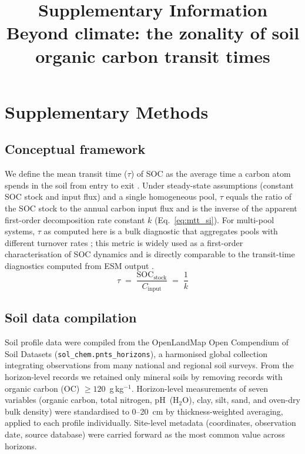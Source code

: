\documentclass[12pt, a4paper]{article}
\title{Supplementary Information\\[4pt]
\large Beyond climate: the zonality of soil organic carbon transit times}
\date{}
\begin{document}
\maketitle

\tableofcontents
\newpage

\section{Supplementary Methods}

\subsection{Conceptual framework}
We define the mean transit time ($\tau$) of SOC as the average time a carbon atom
spends in the soil from entry to exit \citep{Sierra2017,Sierra2018}. Under
steady-state assumptions (constant SOC stock and input flux) and a single homogeneous
pool, $\tau$ equals the ratio of the SOC stock to the annual carbon input flux and is
the inverse of the apparent first-order decomposition rate constant $k$
(Eq.~\ref{eq:mtt_si}). For multi-pool systems, $\tau$ as computed here is a bulk
diagnostic that aggregates pools with different turnover rates \citep{Sierra2018};
this metric is widely used as a first-order characterisation of SOC dynamics and is
directly comparable to the transit-time diagnostics computed from ESM output
\citep{Carvalhais2014,Sierra2017}.
\begin{equation}
  \tau \;=\; \frac{\text{SOC}_\text{stock}}{C_\text{input}} \;=\; \frac{1}{k}
  \label{eq:mtt_si}
\end{equation}

\subsection{Soil data compilation}
Soil profile data were compiled from the OpenLandMap Open Compendium of Soil Datasets
\citep{OpenLandMapSoilDB2025} (\texttt{sol\_chem.pnts\_horizons}), a harmonised global
collection integrating observations from many national and regional soil surveys. From
the horizon-level records we retained only mineral soils by removing records with
organic carbon (OC) $\geq120$~g\,kg$^{-1}$. Horizon-level measurements of seven
variables (organic carbon, total nitrogen, pH~(H$_2$O), clay, silt, sand, and oven-dry
bulk density) were standardised to 0--20~cm by thickness-weighted averaging, applied to
each profile individually. Site-level metadata (coordinates, observation date, source
database) were carried forward as the most common value across horizons.
\end{document}
